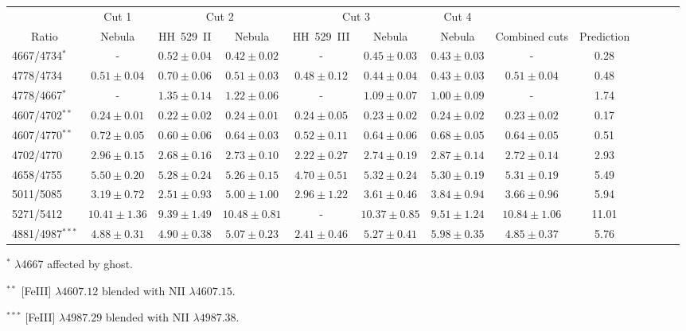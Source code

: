 \documentclass[fleqn,usenatbib]{mnras}
\begin{document}
\begin{table*}
\centering
\caption{Comparison of the observed [Fe\thinspace III] intensity ratios and theoretical ones predicted by the transition probabilities adopted in Table~\ref{tab:atomic_data}}
\label{tab:fe3_ratios_theo}
\begin{tabular}{lcccccccccccc}
\hline
 & \multicolumn{1}{c}{Cut 1} & \multicolumn{2}{c}{Cut 2} & \multicolumn{2}{c}{Cut 3} & \multicolumn{1}{c}{Cut 4} \\
\multicolumn{1}{c}{Ratio} &  Nebula & HH~529~II &  Nebula & HH~529~III &  Nebula &  Nebula & Combined cuts& Prediction \\
\hline
4667/4734$^{*}$ & - & $0.52 \pm 0.04$ & $0.42 \pm 0.02$ & - & $0.45 \pm 0.03$ & $0.43 \pm 0.03$ & - & 0.28 \\
4778/4734 & $0.51 \pm 0.04$ & $0.70 \pm 0.06$ & $0.51 \pm 0.03$ & $0.48 \pm 0.12$ & $0.44 \pm 0.04$ & $0.43 \pm 0.03$ & $0.51 \pm 0.04$ & 0.48  \\
4778/4667$^{*}$ & - & $1.35 \pm 0.14$ & $1.22 \pm 0.06$ & - & $1.09 \pm 0.07$ & $1.00 \pm 0.09$ & - & 1.74 \\
4607/4702$^{**}$ & $0.24 \pm 0.01$ & $0.22 \pm 0.02$ & $0.24 \pm 0.01$ & $0.24 \pm 0.05$ & $0.23 \pm 0.02$ & $0.24 \pm 0.02$ & $0.23 \pm 0.02$ & 0.17\\
4607/4770$^{**}$ & $0.72 \pm 0.05$ & $0.60 \pm 0.06$ & $0.64 \pm 0.03$ & $0.52 \pm 0.11$ & $0.64 \pm 0.06$ & $0.68 \pm 0.05$ & $0.64 \pm 0.05$ & 0.51 \\
4702/4770 & $2.96 \pm 0.15$ & $2.68 \pm 0.16$ & $2.73 \pm 0.10$ & $2.22 \pm 0.27$ & $2.74 \pm 0.19$ & $2.87 \pm 0.14$ & $2.72 \pm 0.14$ & 2.93 \\
4658/4755 & $5.50 \pm 0.20$ & $5.28 \pm 0.24$ & $5.26 \pm 0.15$ & $4.70 \pm 0.51$ & $5.32 \pm 0.24$ & $5.30 \pm 0.19$ & $5.31 \pm 0.19$ & 5.49  \\
5011/5085 & $3.19 \pm 0.72$ & $2.51 \pm 0.93$ & $5.00 \pm 1.00$ & $2.96 \pm 1.22$ & $3.61 \pm 0.46$ & $3.84 \pm 0.94$ & $3.66 \pm 0.96$ & 5.94 \\
5271/5412 & $10.41 \pm 1.36$ & $9.39 \pm 1.49$ & $10.48 \pm 0.81$ & - & $10.37 \pm 0.85$ & $9.51 \pm 1.24$ & $10.84 \pm 1.06$ & 11.01\\
4881/4987$^{***}$ & $4.88 \pm 0.31$ & $4.90 \pm 0.38$ & $5.07 \pm 0.23$ & $2.41 \pm 0.46$ & $5.27 \pm 0.41$ & $5.98 \pm 0.35$ & $4.85 \pm 0.37$ & 5.76  \\
\hline
\end{tabular}
\begin{description}
\item $^*$ $\lambda$4667 affected by ghost. \\
\item $^{**}$ [Fe\thinspace III] $\lambda 4607.12$ blended with  N\thinspace II $\lambda 4607.15$. \\
\item $^{***}$ [Fe\thinspace III] $\lambda 4987.29$ blended with  N\thinspace II $\lambda 4987.38$. \\
\end{description}
\end{table*}
\end{document}
